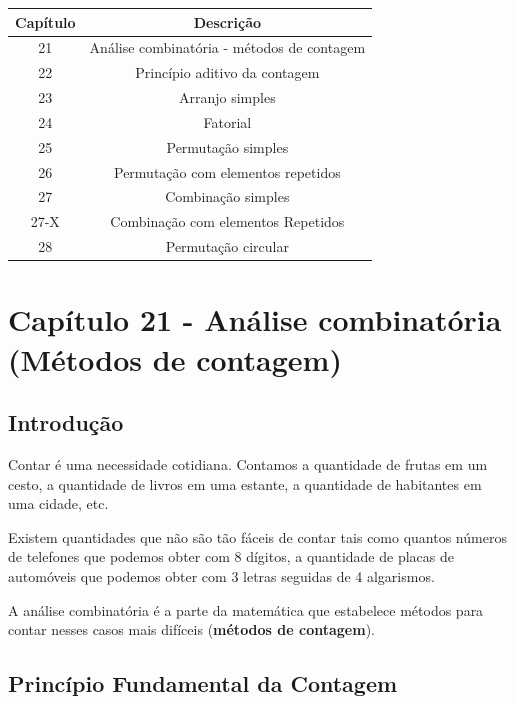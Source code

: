 \documentclass[
]{book}
\begin{document}
\begin{longtable}[]{@{}cc@{}}
\toprule()
Capítulo & Descrição \\
\midrule()
\endhead
21 & Análise combinatória - métodos de contagem \\
22 & Princípio aditivo da contagem \\
23 & Arranjo simples \\
24 & Fatorial \\
25 & Permutação simples \\
26 & Permutação com elementos repetidos \\
27 & Combinação simples \\
27-X & Combinação com elementos Repetidos \\
28 & Permutação circular \\
\bottomrule()
\end{longtable}

\hypertarget{capuxedtulo-21---anuxe1lise-combinatuxf3ria-muxe9todos-de-contagem}{%
\section{Capítulo 21 - Análise combinatória (Métodos de contagem)}\label{capuxedtulo-21---anuxe1lise-combinatuxf3ria-muxe9todos-de-contagem}}

\hypertarget{introduuxe7uxe3o}{%
\subsection{Introdução}\label{introduuxe7uxe3o}}

Contar é uma necessidade cotidiana. Contamos a quantidade de frutas em um cesto, a quantidade de livros em uma estante, a quantidade de habitantes em uma cidade, etc.

Existem quantidades que não são tão fáceis de contar tais como quantos números de telefones que podemos obter com 8 dígitos, a quantidade de placas de automóveis que podemos obter com 3 letras seguidas de 4 algarismos.

A análise combinatória é a parte da matemática que estabelece métodos para contar nesses casos mais difíceis (\textbf{métodos de contagem}).

\hypertarget{princuxedpio-fundamental-da-contagem}{%
\subsection{Princípio Fundamental da Contagem}\label{princuxedpio-fundamental-da-contagem}}
\end{document}

